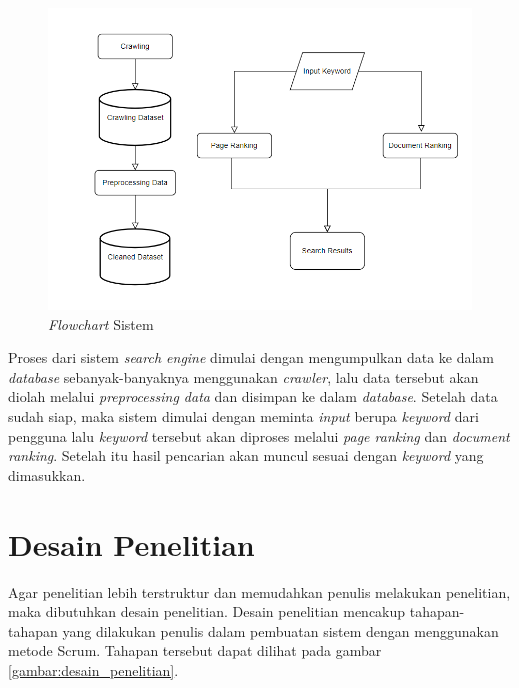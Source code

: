 \begin{figure}[H]
	\centering
	\includegraphics[keepaspectratio, width=13cm]{gambar/flowchart_sistem}
	\caption{\textit{Flowchart} Sistem}
	\label{gambar:flowchart_sistem}
\end{figure}

Proses dari sistem \textit{search engine} dimulai dengan mengumpulkan data ke dalam \textit{database} sebanyak-banyaknya menggunakan \textit{crawler}, lalu data tersebut akan diolah melalui \textit{preprocessing data} dan disimpan ke dalam \textit{database}. Setelah data sudah siap, maka sistem dimulai dengan meminta \textit{input} berupa \textit{keyword} dari pengguna lalu \textit{keyword} tersebut akan diproses melalui \textit{page ranking} dan \textit{document ranking}. Setelah itu hasil pencarian akan muncul sesuai dengan \textit{keyword} yang dimasukkan.

\section{Desain Penelitian}

Agar penelitian lebih terstruktur dan memudahkan penulis melakukan penelitian, maka dibutuhkan desain penelitian. Desain penelitian mencakup tahapan-tahapan yang dilakukan penulis dalam pembuatan sistem dengan menggunakan metode Scrum. Tahapan tersebut dapat dilihat pada gambar \ref{gambar:desain_penelitian}.

